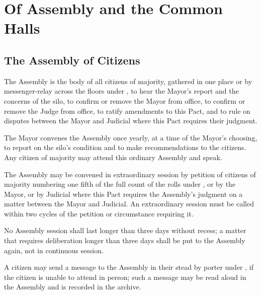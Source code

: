 \chapter{Of Assembly and the Common Halls}
\label{art:assembly}


\section{The Assembly of Citizens}
\label{sec:assembly:assembly-of-citizens}

The Assembly is the body of all citizens of majority, gathered in one place or by messenger-relay across the floors under , to hear the Mayor's report and the concerns of the silo, to confirm or remove the Mayor from office, to confirm or remove the Judge from office, to ratify amendments to this Pact, and to rule on disputes between the Mayor and Judicial where this Pact requires their judgment.

\begin{clauses}
\item The Mayor convenes the Assembly once yearly, at a time of the Mayor's choosing, to report on the silo's condition and to make recommendations to the citizens. Any citizen of majority may attend this ordinary Assembly and speak.
\item The Assembly may be convened in extraordinary session by petition of citizens of majority numbering one fifth of the full count of the rolls under , or by the Mayor, or by Judicial where this Pact requires the Assembly's judgment on a matter between the Mayor and Judicial. An extraordinary session must be called within two cycles of the petition or circumstance requiring it.
\item No Assembly session shall last longer than three days without recess; a matter that requires deliberation longer than three days shall be put to the Assembly again, not in continuous session.
\item A citizen may send a message to the Assembly in their stead by porter under , if the citizen is unable to attend in person; such a message may be read aloud in the Assembly and is recorded in the archive.
\end{clauses}

